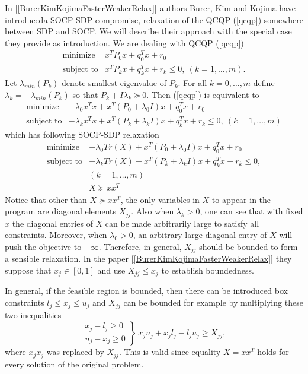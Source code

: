 \documentclass[12pt]{book}
\theoremstyle{definition}
\begin{document}
In [\ref{BurerKimKojimaFasterWeakerRelax}] authors Burer, Kim and Kojima have introduceda SOCP-SDP compromise, relaxation of the QCQP (\ref{qcqp}) somewhere between SDP and SOCP. We will describe their approach with the special case they provide as introduction.
We are dealing with QCQP (\ref{qcqp})
\begin{equation}
\begin{array}{ll}
\mbox{minimize}& x^TP_0x + q_0^Tx + r_0 \\
\mbox{subject to}& x^TP_kx + q_k^Tx + r_k \leq 0, \  (k = 1,\dots ,m).
\end{array} 
\end{equation}
Let  $\lambda_{min}(P_k)$ denote smallest eigenvalue of $P_k$.
For all $k=0,\dots ,m$ define $\lambda_k=-\lambda_{min}(P_k)$ so that $P_k + I\lambda_k\succeq 0$. Then (\ref{qcqp}) is equivalent to 
\begin{equation}
\begin{array}{ll}
\mbox{minimize}& -\lambda_0 x^Tx +  x^T(P_0+\lambda_0 I)x + q_0^Tx + r_0\\
\mbox{subject to}& -\lambda_kx^Tx +  x^T(P_k+\lambda_kI)x + q_k^Tx + r_k \leq 0, \  (k = 1,\dots ,m)
\end{array} 
\end{equation}
which has following SOCP-SDP relaxation
\begin{equation}
\label{InBetweenSOCPSDP1}
\begin{array}{ll}
\mbox{minimize}& -\lambda_0 Tr(X) +  x^T(P_0+\lambda_0 I)x + q_0^Tx +r_0 \\
\mbox{subject to}& -\lambda_k Tr(X) +  x^T(P_k+\lambda_kI)x + q_k^Tx + r_k \leq 0, \\  
&(k = 1,\dots ,m) \\
& X\succeq xx^T
\end{array} 
\end{equation}
Notice that other than $X\succeq xx^T$, the only variables in $X$ to appear in the program are diagonal elements $X_{jj}$.
Also when $\lambda_k>0$, one can see that with fixed $x$ the diagonal entries of $X$ can be made arbitrarily large to satisfy all constraints. Moreover, when $\lambda_0>0$, an arbitrary large diagonal entry of $X$ will push the objective to $-\infty .$ Therefore, in general, $X_{jj}$ should be bounded to form a sensible relaxation. In the paper [\ref{BurerKimKojimaFasterWeakerRelax}] they suppose that $x_j\in [0,1]$ and use $X_{jj}\leq x_j$ to establish boundedness. 

\rem In general, if the feasible region is bounded, then there can be introduced box constraints $l_j\leq x_j \leq u_j$ and $X_{jj}$ can be bounded for example by multiplying these two inequalities 
\begin{equation}
\left.\begin{array}{r}
x_j - l_j \geq 0\\
u_j - x_j \geq 0
\end{array}\right\rbrace \
x_ju_j + x_jl_j - l_ju_j \geq X_{jj},
\end{equation} 
where $x_jx_j$ was replaced by $X_{jj}$. This is valid since equality $X = xx^T$ holds for every solution of the original problem. 
\medskip
\end{document}
